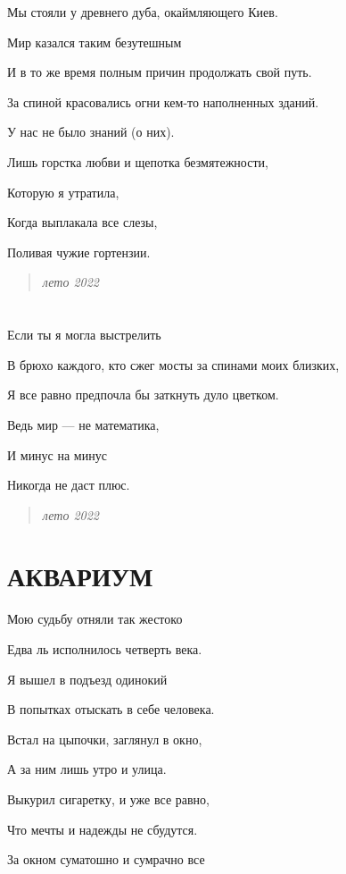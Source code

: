 \documentclass[
  a5paperpaper,
  DIV=11,
  numbers=noendperiod]{scrreprt}
\begin{document}
Мы стояли у древнего дуба, окаймляющего Киев.

Мир казался таким безутешным

И в то же время полным причин продолжать свой путь.

За спиной красовались огни кем-то наполненных зданий.

У нас не было знаний (о них).

Лишь горстка любви и щепотка безмятежности,

Которую я утратила,

Когда выплакала все слезы,

Поливая чужие гортензии.

\begin{quote}
\emph{лето 2022}
\end{quote}

\section{}\label{section-13}

Если ты я могла выстрелить

В брюхо каждого, кто сжег мосты за спинами моих близких,

Я все равно предпочла бы заткнуть дуло цветком.

Ведь мир --- не математика,

И минус на минус

Никогда не даст плюс.

\begin{quote}
\emph{лето 2022}
\end{quote}

\section{АКВАРИУМ}\label{ux430ux43aux432ux430ux440ux438ux443ux43c}

Мою судьбу отняли так жестоко

Едва ль исполнилось четверть века.

Я вышел в подъезд одинокий

В попытках отыскать в себе человека.

Встал на цыпочки, заглянул в окно,

А за ним лишь утро и улица.

Выкурил сигаретку, и уже все равно,

Что мечты и надежды не сбудутся.

За окном суматошно и сумрачно все
\end{document}
